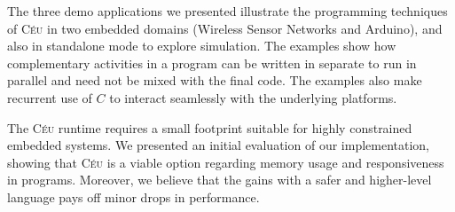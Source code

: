 \documentclass[11pt,a4paper]{article}
\newcommand{\2}{\;\;}
\newcommand{\5}{\;\;\;\;\;}
\newcommand{\CEU}{\textsc{C\'{e}u}}
\begin{document}

The three demo applications we presented illustrate the programming techniques 
of \CEU{} in two embedded domains (Wireless Sensor Networks and Arduino), and 
also in standalone mode to explore simulation.
The examples show how complementary activities in a program can be written in 
separate to run in parallel and need not be mixed with the final code.
The examples also make recurrent use of $C$ to interact seamlessly with the 
underlying platforms.

The \CEU{} runtime requires a small footprint suitable for highly constrained 
embedded systems.
We presented an initial evaluation of our implementation, showing that \CEU{} 
is a viable option regarding memory usage and responsiveness in programs.
Moreover, we believe that the gains with a safer and higher-level language pays 
off minor drops in performance.
\end{document}
